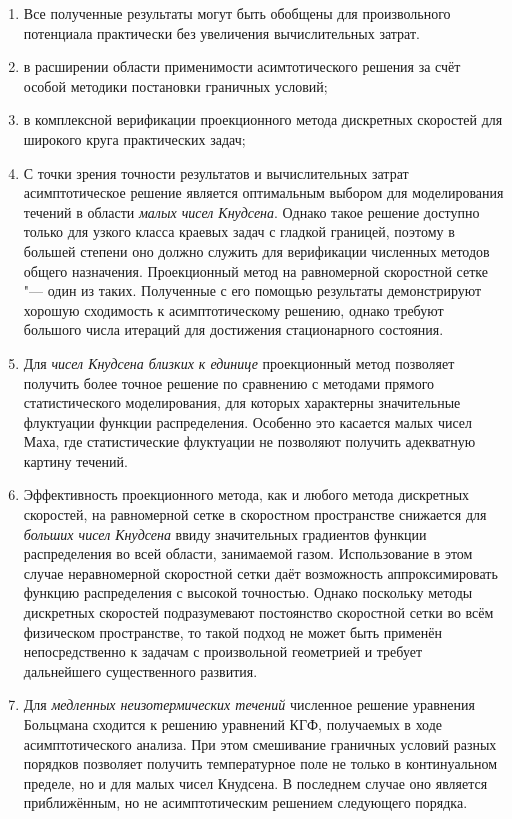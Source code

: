 \begin{enumerate}

\item Все полученные результаты могут быть обобщены для произвольного потенциала
практически без увеличения вычислительных затрат.

\item в расширении области применимости асимтотического решения за счёт
особой методики постановки граничных условий;

\item в комплексной верификации проекционного метода дискретных скоростей
для широкого круга практических задач;

\item С точки зрения точности результатов и вычислительных затрат асимптотическое решение
является оптимальным выбором для моделирования течений в области \emph{малых чисел Кнудсена}.
Однако такое решение доступно только для узкого класса краевых задач с гладкой границей,
поэтому в большей степени оно должно служить для верификации численных методов общего назначения.
Проекционный метод на равномерной скоростной сетке "--- один из таких.
Полученные с его помощью результаты демонстрируют хорошую сходимость к асимптотическому решению,
однако требуют большого числа итераций для достижения стационарного состояния.
\item Для \emph{чисел Кнудсена близких к единице} проекционный метод позволяет получить
более точное решение по сравнению с методами прямого статистического моделирования,
для которых характерны значительные флуктуации функции распределения.
Особенно это касается малых чисел Маха, где статистические флуктуации не позволяют
получить адекватную картину течений.
\item Эффективность проекционного метода, как и любого метода дискретных скоростей,
на равномерной сетке в скоростном пространстве снижается для \emph{больших чисел Кнудсена}
ввиду значительных градиентов функции распределения во всей области, занимаемой газом.
Использование в этом случае неравномерной скоростной сетки даёт возможность
аппроксимировать функцию распределения с высокой точностью. Однако поскольку методы
дискретных скоростей подразумевают постоянство скоростной сетки во всём физическом
пространстве, то такой подход не может быть применён непосредственно к задачам
с произвольной геометрией и требует дальнейшего существенного развития.
\item Для \emph{медленных неизотермических течений} численное решение уравнения Больцмана
сходится к решению уравнений КГФ, получаемых в ходе асимптотического анализа.
При этом смешивание граничных условий разных порядков позволяет получить
температурное поле не только в континуальном пределе, но и для малых чисел Кнудсена.
В последнем случае оно является приближённым, но не асимптотическим решением
следующего порядка.


\end{enumerate}
